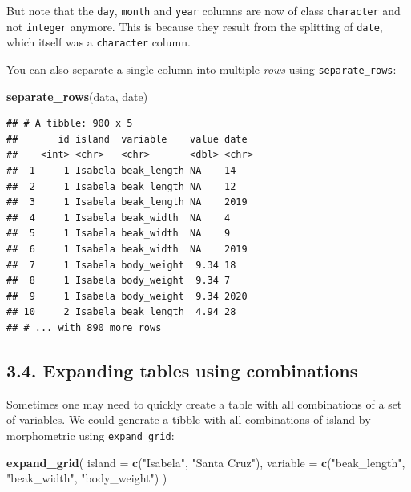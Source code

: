 \documentclass[]{book}
\newenvironment{Shaded}{}{}
\newcommand{\DataTypeTok}[1]{\textcolor[rgb]{0.56,0.13,0.00}{#1}}
\newcommand{\KeywordTok}[1]{\textcolor[rgb]{0.00,0.44,0.13}{\textbf{#1}}}
\newcommand{\NormalTok}[1]{#1}
\newcommand{\StringTok}[1]{\textcolor[rgb]{0.25,0.44,0.63}{#1}}
\begin{document}
But note that the \texttt{day}, \texttt{month} and \texttt{year} columns are now of class \texttt{character} and not \texttt{integer} anymore. This is because they result from the splitting of \texttt{date}, which itself was a \texttt{character} column.

You can also separate a single column into multiple \emph{rows} using \texttt{separate\_rows}:

\begin{Shaded}
\begin{Highlighting}[]
\KeywordTok{separate_rows}\NormalTok{(data, date)}
\end{Highlighting}
\end{Shaded}

\begin{verbatim}
## # A tibble: 900 x 5
##       id island  variable    value date 
##    <int> <chr>   <chr>       <dbl> <chr>
##  1     1 Isabela beak_length NA    14   
##  2     1 Isabela beak_length NA    12   
##  3     1 Isabela beak_length NA    2019 
##  4     1 Isabela beak_width  NA    4    
##  5     1 Isabela beak_width  NA    9    
##  6     1 Isabela beak_width  NA    2019 
##  7     1 Isabela body_weight  9.34 18   
##  8     1 Isabela body_weight  9.34 7    
##  9     1 Isabela body_weight  9.34 2020 
## 10     2 Isabela beak_length  4.94 28   
## # ... with 890 more rows
\end{verbatim}

\hypertarget{expanding-tables-using-combinations}{%
\subsection{3.4. Expanding tables using combinations}\label{expanding-tables-using-combinations}}

Sometimes one may need to quickly create a table with all combinations of a set of variables. We could generate a tibble with all combinations of island-by-morphometric using \texttt{expand\_grid}:

\begin{Shaded}
\begin{Highlighting}[]
\KeywordTok{expand_grid}\NormalTok{(}
  \DataTypeTok{island =} \KeywordTok{c}\NormalTok{(}\StringTok{"Isabela"}\NormalTok{, }\StringTok{"Santa Cruz"}\NormalTok{), }
  \DataTypeTok{variable =} \KeywordTok{c}\NormalTok{(}\StringTok{"beak_length"}\NormalTok{, }\StringTok{"beak_width"}\NormalTok{, }\StringTok{"body_weight"}\NormalTok{)}
\NormalTok{)}
\end{Highlighting}
\end{Shaded}
\end{document}
